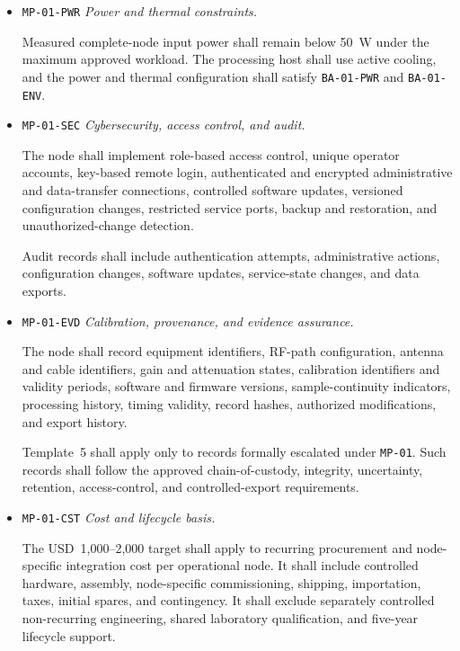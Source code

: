 \documentclass[11pt,a4paper]{article}
\begin{document}
\begin{itemize}[leftmargin=*]
		Network transfer shall be restricted to authorized metadata, derived
		products, health records, events, and selected-IQ records.
		
		\item \texttt{MP-01-PWR} \emph{Power and thermal constraints.}
		
		Measured complete-node input power shall remain below 50~W under the
		maximum approved workload. The processing host shall use active cooling,
		and the power and thermal configuration shall satisfy
		\texttt{BA-01-PWR} and \texttt{BA-01-ENV}.
		
		\item \texttt{MP-01-SEC} \emph{Cybersecurity, access control, and audit.}
		
		The node shall implement role-based access control, unique operator
		accounts, key-based remote login, authenticated and encrypted
		administrative and data-transfer connections, controlled software
		updates, versioned configuration changes, restricted service ports,
		backup and restoration, and unauthorized-change detection.
		
		Audit records shall include authentication attempts, administrative
		actions, configuration changes, software updates, service-state changes,
		and data exports.
		
		\item \texttt{MP-01-EVD} \emph{Calibration, provenance, and evidence
			assurance.}
		
		The node shall record equipment identifiers, RF-path configuration,
		antenna and cable identifiers, gain and attenuation states, calibration
		identifiers and validity periods, software and firmware versions,
		sample-continuity indicators, processing history, timing validity, record
		hashes, authorized modifications, and export history.
		
		Template~5 shall apply only to records formally escalated under
		\texttt{MP-01}. Such records shall follow the approved chain-of-custody,
		integrity, uncertainty, retention, access-control, and controlled-export
		requirements.
		
		\item \texttt{MP-01-CST} \emph{Cost and lifecycle basis.}
		
		The USD~1,000--2,000 target shall apply to recurring procurement and
		node-specific integration cost per operational node. It shall include
		controlled hardware, assembly, node-specific commissioning, shipping,
		importation, taxes, initial spares, and contingency. It shall exclude
		separately controlled non-recurring engineering, shared laboratory
		qualification, and five-year lifecycle support.
		

\end{itemize}
\end{document}
